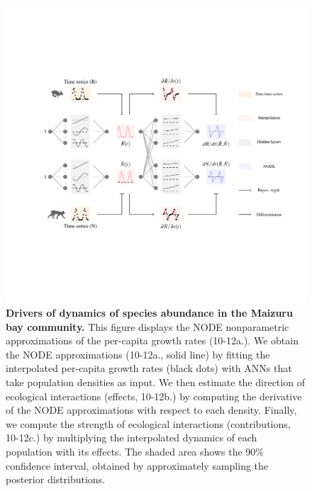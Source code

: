 \documentclass[11pt, oneside]{article}
\begin{document}
\begin{figure}[H]
\includegraphics[width=1\linewidth,page=38]{figures/main.pdf}
\caption{
    \textbf{Drivers of dynamics of species abundance in the Maizuru bay community.}
    This figure displays the NODE nonparametric approximations of the per-capita growth rates (10-12a.). 
    We obtain the NODE approximations (10-12a., solid line) by fitting the interpolated per-capita growth rates (black dots) with ANNs that take population densities as input. 
    We then estimate the direction of ecological interactions (effects, 10-12b.) by computing the derivative of the NODE approximations with respect to each density. 
    Finally, we compute the strength of ecological interactions (contributions, 10-12c.) by multiplying the interpolated dynamics of each population with its effects. 
    The shaded area shows the 90\% confidence interval, obtained by approximately sampling the posterior distributions.
}
\end{figure}
\newpage
\end{document}
